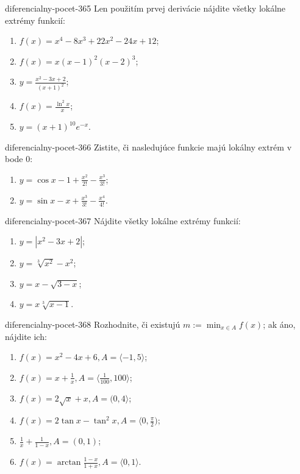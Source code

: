\begin{defproblem}{diferencialny-pocet-365}
Len použitím prvej derivácie nájdite všetky lokálne extrémy funkcií:
\begin{multicols}{2}
\begin{enumerate}
    \item $f(x)=x^4-8x^3+22x^2-24x+12$;
	\item $f(x)=x(x-1)^2(x-2)^3$;
	\item $y=\frac{x^2-3x+2}{(x+1)^2}$;
	\item $f(x)=\frac{\ln^2 x}{x}$;
	\item $y=(x+1)^{10}e^{-x}$.
\end{enumerate}
\end{multicols}
\end{defproblem}

\begin{defproblem}{diferencialny-pocet-366}
Zistite, či nasledujúce funkcie majú lokálny extrém v bode $0$:
\begin{multicols}{2}
\begin{enumerate}
    \item $y=\cos x-1+\frac{x^2}{2!}-\frac{x^3}{3!}$;
	\item $y=\sin x-x+\frac{x^3}{3!}-\frac{x^4}{4!}$.
\end{enumerate}
\end{multicols}
\end{defproblem}

\begin{defproblem}{diferencialny-pocet-367}
Nájdite všetky lokálne extrémy funkcií:
\begin{multicols}{2}
\begin{enumerate}
    \item $y=|x^2-3x+2|$;
	\item $y=\sqrt[3]{x^2}-x^2$;
	\item $y=x-\sqrt{3-x}$;
	\item $y=x\sqrt[3]{x-1}$.
\end{enumerate}
\end{multicols}
\end{defproblem}

\begin{defproblem}{diferencialny-pocet-368}
Rozhodnite, či existujú $m:=\min_{x\in A}f(x)$; ak áno, nájdite ich:
\begin{enumerate}
\item $f(x)=x^2-4x+6,A=\langle -1,5 \rangle$;
\item $f(x)=x+\frac{1}{x},A=\langle \frac{1}{100},100\rangle$;
\item $f(x)=2\sqrt{x}+x,A=(0,4\rangle$;
\item $f(x)=2\tan x-\tan^2 x,A=\langle 0,\frac{\pi}{2})$;
\item $\frac{1}{x}+\frac{1}{1-x},A=(0,1)$;
\item $f(x)=\arctan \frac{1-x}{1+x},A=\langle 0,1 \rangle$.
\end{enumerate}
\end{defproblem}

